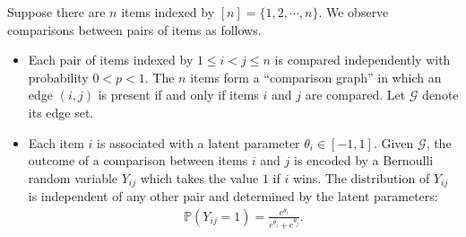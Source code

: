 \documentclass[letterpaper,12pt]{article}
\numberwithin{equation}{section}
\theoremstyle{plain}
\numberwithin{Theorem}{section}
\numberwithin{proposition}{section}
\numberwithin{Lemma}{section}
{
	\theoremstyle{definition}
	\newtheorem{Definition}{Definition}
	\newtheorem{example}{Example}
	\numberwithin{example}{section}
	\newtheorem{fact}{Fact}
	\numberwithin{fact}{section}
	\newtheorem{remark}{Remark}
}
\newcommand{\Pro}{\mathbb{P}}
\newcommand{\1}{\mathbbm{1}}
\begin{document}
Suppose there are $n$ items indexed by $[n] = \{1, 2,  \cdots, n\}$. We observe comparisons between pairs of items as follows.
\begin{itemize}
		\item Each pair of items indexed by $1 \leq i < j \leq n$ is compared independently with probability $0 < p < 1$. The $n$ items form a ``comparison graph'' in which an edge $(i,j)$ is present if and only if items $i$ and $j$ are compared. Let $\mathcal G$ denote its edge set.
	\item Each item $i$ is associated with a latent parameter $\theta_i \in [-1, 1]$. Given $\mathcal G$, the outcome of a comparison between items $i$ and $j$ is encoded by a Bernoulli random variable $Y_{ij}$ which takes the value $1$ if $i$ wins. The distribution of $Y_{ij}$ is independent of any other pair and determined by the latent parameters:
	\begin{align*}
		\Pro(Y_{ij} = 1) = \frac{e^{\theta_i}}{e^{\theta_i} + e^{\theta_j}}.
	\end{align*}
\end{itemize}
\end{document}
